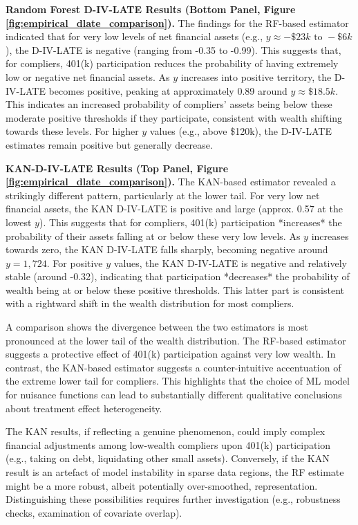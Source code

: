 \documentclass[final,3p,fleqn, 10pt]{elsarticle}
\begin{document}
\textbf{Random Forest D-IV-LATE Results (Bottom Panel, Figure \ref{fig:empirical_dlate_comparison}).}
The findings for the RF-based estimator indicated that for very low levels of net financial assets (e.g., $y \approx -\$23k \text{ to } -\$6k$), the D-IV-LATE is negative (ranging from -0.35 to -0.99). This suggests that, for compliers, 401(k) participation reduces the probability of having extremely low or negative net financial assets. As $y$ increases into positive territory, the D-IV-LATE becomes positive, peaking at approximately 0.89 around $y \approx \$18.5k$. This indicates an increased probability of compliers' assets being below these moderate positive thresholds if they participate, consistent with wealth shifting towards these levels. For higher $y$ values (e.g., above \$120k), the D-IV-LATE estimates remain positive but generally decrease.

\textbf{KAN-D-IV-LATE Results (Top Panel, Figure \ref{fig:empirical_dlate_comparison}).}
The KAN-based estimator revealed a strikingly different pattern, particularly at the lower tail. For very low net financial assets, the KAN D-IV-LATE is positive and large (approx. 0.57 at the lowest $y$). This suggests that for compliers, 401(k) participation *increases* the probability of their assets falling at or below these very low levels. As $y$ increases towards zero, the KAN D-IV-LATE falls sharply, becoming negative around $y = 1,724$. For positive $y$ values, the KAN D-IV-LATE is negative and relatively stable (around -0.32), indicating that participation *decreases* the probability of wealth being at or below these positive thresholds. This latter part is consistent with a rightward shift in the wealth distribution for most compliers.

A comparison shows the divergence between the two estimators is most pronounced at the lower tail of the wealth distribution. The RF-based estimator suggests a protective effect of 401(k) participation against very low wealth. In contrast, the KAN-based estimator suggests a counter-intuitive accentuation of the extreme lower tail for compliers. This highlights that the choice of ML model for nuisance functions can lead to substantially different qualitative conclusions about treatment effect heterogeneity.

The KAN results, if reflecting a genuine phenomenon, could imply complex financial adjustments among low-wealth compliers upon 401(k) participation (e.g., taking on debt, liquidating other small assets). Conversely, if the KAN result is an artefact of model instability in sparse data regions, the RF estimate might be a more robust, albeit potentially over-smoothed, representation. Distinguishing these possibilities requires further investigation (e.g., robustness checks, examination of covariate overlap).
\end{document}
